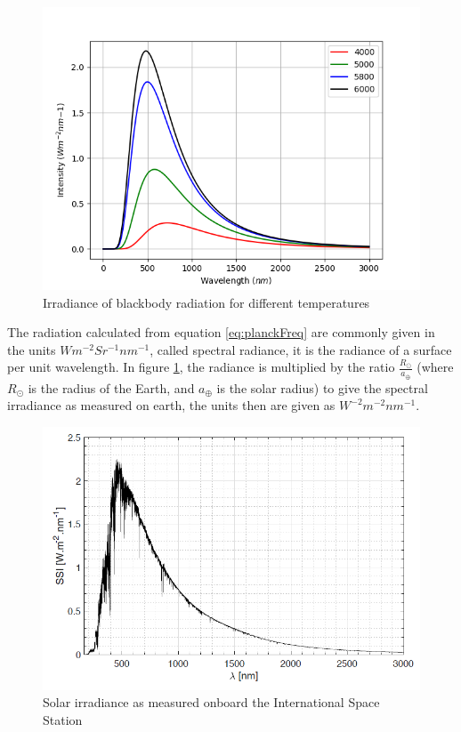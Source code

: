 \begin{figure}[h!]
    \centering
    \includegraphics[scale=0.6]{figures/blackbody.png}
    \caption{Irradiance of blackbody radiation for different temperatures}
    \label{fig:blackbody}
\end{figure}


The radiation calculated from equation \ref{eq:planckFreq} are commonly given in the units $W m^{-2} Sr^{-1} nm^{-1}$, called spectral radiance, it is the radiance of a surface per unit wavelength. In figure \ref{fig:blackbody}, the radiance is multiplied by the ratio $\frac{R_{\odot}}{a_{\oplus}}$ (where $R_{\odot}$ is the radius of the Earth, and $a_{\oplus}$ is the solar radius) to give the spectral irradiance as measured on earth, the units then are given as  $W ^{-2} m^{-2} nm^{-1}$.
\\

\begin{figure}[h!]
    \centering
    \includegraphics[scale=0.6]{figures/solarspectrum.png}
    \caption{Solar irradiance as measured onboard the International Space Station}
    \label{fig:solIrradiance}
\end{figure}

